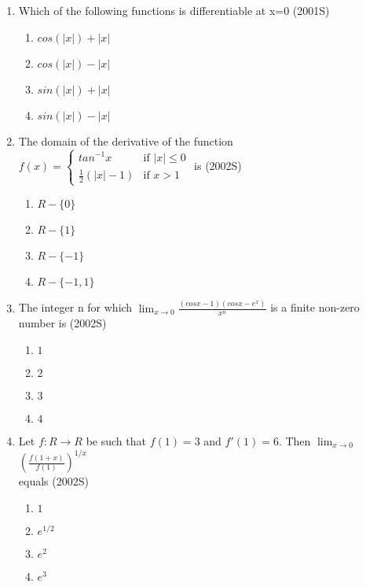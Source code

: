 \documentclass[journal,12pt,twocolumn]{IEEEtran}
\theoremstyle{remark}
\begin{document}
\begin{enumerate}
\item %

    Which of the following functions is differentiable at x=0 \hfill{(2001S)}
    \begin{enumerate}
     \item $cos(|x|)+|x|$
     \item $cos(|x|)-|x|$
     \item $sin(|x|)+|x|$
     \item $sin(|x|)-|x|$\\
    \end{enumerate}


\item %

    The domain of the derivative of the function $f(x)= \left\{
\begin{array}{ll}
tan^{-1}x
 & \text{if } |x| \leq 0 \\
\frac{1}{2}(|x|-1) & \text{if } x > 1
\end{array}
\right.$ is \hfill{(2002S)}
    \begin{enumerate}
     \item $R-\{0\}$
     \item $R-\{1\}$
     \item $R-\{-1\}$
     \item $R-\{-1,1\}$\\
    \end{enumerate}


\item %

   The integer n for which $\lim_{x \to 0}\frac{(cosx-1)(cosx-e^{x})}{x^{n}}$ is a finite non-zero number is \hfill{(2002S)}
    \begin{enumerate}
     \item $1$
     \item $2$
     \item $3$
     \item $4$\\
    \end{enumerate}

\item %

Let $f:R \rightarrow R$ be such that $f(1)=3$ and $f'(1)=6$. Then $\lim_{x \to 0}$ $ \left (\frac{f(1+x)}{f(1)}\right)^{1/x}$\ \\ equals \hfill{(2002S)}
    \begin{enumerate}
     \item $1$
     \item $e^{1/2}$
     \item $e^2$
     \item $e^3$\\
    \end{enumerate}



\end{enumerate}
\end{document}

